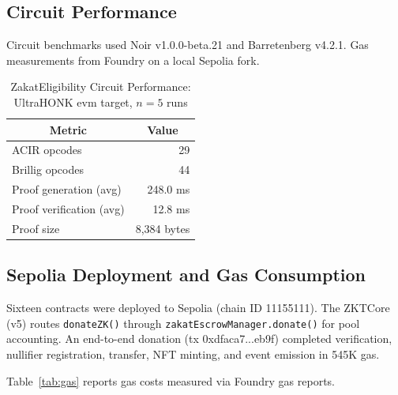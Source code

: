\documentclass[conference]{IEEEtran}
\begin{document}
\subsection{Circuit Performance}

Circuit benchmarks used Noir v1.0.0-beta.21 and Barretenberg v4.2.1. Gas measurements from Foundry on a local Sepolia fork.

\begin{table}[htbp]
\caption{ZakatEligibility Circuit Performance: UltraHONK evm target, $n=5$ runs}
\label{tab:proof_perf}
\begin{center}
\begin{tabular}{|l|r|}
\hline
\multicolumn{1}{|c|}{\textbf{Metric}} & \multicolumn{1}{c|}{\textbf{Value}} \\
\hline
ACIR opcodes               & 29 \\
Brillig opcodes            & 44 \\
Proof generation (avg)     & 248.0 ms \\
Proof verification (avg)    & 12.8 ms \\
Proof size                  & 8,384 bytes \\
\hline
\end{tabular}
\end{center}
\end{table}

\subsection{Sepolia Deployment and Gas Consumption}

Sixteen contracts were deployed to Sepolia (chain ID 11155111). The ZKTCore (v5) routes \texttt{donateZK()} through \texttt{zakatEscrowManager.donate()} for pool accounting. An end-to-end donation (tx 0xdfaca7...eb9f) completed verification, nullifier registration, transfer, NFT minting, and event emission in 545K gas.

Table~\ref{tab:gas} reports gas costs measured via Foundry gas reports.
\end{document}
